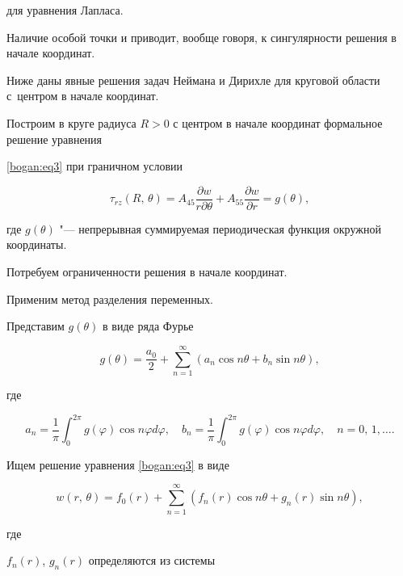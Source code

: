 для уравнения Лапласа. 

Наличие особой точки и приводит, вообще говоря, к сингулярности решения в начале координат. 

Ниже даны явные решения задач Неймана и Дирихле для круговой области с~центром в начале координат.



\smallskip



 Построим  в круге радиуса $ R> 0 $ с центром в начале координат формальное решение уравнения

\eqref{bogan:eq3} при граничном условии

\begin{equation}

\label{bogan:eq8}

 \tau_{r z}(R,\,\theta)=A_{45}\frac{\partial w}{r

\partial \theta}+A_{55}\frac{\partial w}{\partial r}=g(\theta),

\end{equation}

где $ g(\theta) $ "--- непрерывная суммируемая  периодическая функция окружной координаты. 

Потребуем ограниченности решения в начале координат. 

Применим  метод разделения переменных. 

Представим $ g(\theta) $ в виде ряда Фурье 

\[

 g(\theta)= \frac{a_0}{2}+ \sum_{n=1}^\infty( a_n\cos n\theta+b_n\sin n\theta),

  \]

где

\[

 a_n=\dfrac{1}{\pi}\int_0^{2\pi} g(\varphi) \cos n \varphi d\varphi,\quad

  b_n= \dfrac{1}{\pi}\int_0^{2\pi} g(\varphi) \cos n \varphi d\varphi, \quad  n=0,\,1, \ldots.

  \]



Ищем решение уравнения \eqref{bogan:eq3} в виде

\[

 w(r,\,\theta)=f_0(r)+ \sum_{n=1}^\infty( f_n(r)\cos n\theta+g_n(r)\sin n\theta),

\]

где 

$ f_n(r)$, $g_n(r) $ определяются из системы

